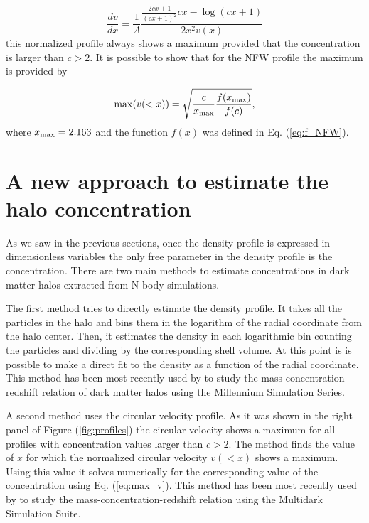 \documentclass[useAMS,usenatbib]{mn2e}
\begin{document}
\begin{equation}
\frac{dv}{dx}=\frac{1}{A}\frac{\frac{2cx+1}{\left(cx+1\right)^{2}}cx-\log\left(cx+1\right)}{2x^{2}v\left(x\right)}
\end{equation}
%
this normalized profile always shows a maximum provided that the
concentration is larger than $c>2$.
It is possible to show that for the NFW profile the maximum is
provided by

\begin{equation}
\mathrm{max}(v(<x)) = \sqrt{\frac{c}{x_{\rm max}}\frac{f(x_{\rm
      max})}{f(c)}},
\label{eq:max_v}
\end{equation}
where $x_{\rm max}=2.163$ and the function $f(x)$ was defined in Eq. (\ref{eq:f_NFW}).

\section{A new approach to estimate the halo concentration}
\label{sec:method}

As we saw in the previous sections, once the density profile is
expressed in dimensionless variables the only free parameter in the
density profile  is the concentration. There are two main methods to
estimate concentrations in dark matter halos extracted from N-body
simulations.

The first method tries to directly estimate the density profile.
It takes all the particles in the halo and bins them in the logarithm
of the radial coordinate from the halo center.
Then, it estimates the density in each logarithmic bin counting the
particles and dividing by the corresponding shell volume.
At this point is is possible to make a direct fit to the density as a
function of the radial coordinate.
This method has been most recently used by \cite{Ludlow2014} to study
the mass-concentration-redshift relation of dark matter halos using
the Millennium Simulation Series.

A second method uses the circular velocity profile.
As it was shown in the right panel of Figure (\ref{fig:profiles}) the
circular velocity shows a maximum for all profiles with concentration
values larger than $c>2$.
The method finds the value of $x$ for which the normalized circular
velocity $v(<x)$ shows a maximum.
Using this value it solves numerically for the corresponding value of
the concentration using Eq. (\ref{eq:max_v}).
This method has been most recently used by \cite{Klypin2014} to study
the mass-concentration-redshift relation using the Multidark
Simulation Suite.
\end{document}
